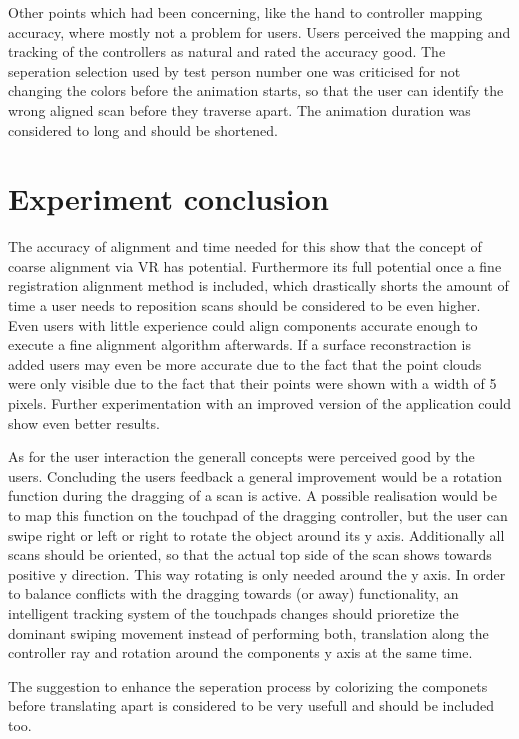 \documentclass[hyperref,english,bachelorofscience,bibnum]{cgvpub}
\begin{document}
Other points which had been concerning, like the hand to controller mapping accuracy, where mostly not a problem for users. Users perceived the mapping and tracking of the controllers as natural and rated the accuracy good. The seperation selection used by test person number one was criticised for not changing the colors before the animation starts, so that the user can identify the wrong aligned scan before they traverse apart. The animation duration was considered to long and should be shortened.

\section{Experiment conclusion}

The accuracy of alignment and time needed for this show that the concept of coarse alignment via VR has potential. Furthermore its full potential once a fine registration alignment method is included, which drastically shorts the amount of time a user needs to reposition scans   should be considered to be even higher. Even users with little experience could align components accurate enough to execute a fine alignment algorithm afterwards. If a surface reconstraction is added users may even be more accurate due to the fact that the point clouds were only visible due to the fact that their points were shown with a width of 5 pixels. Further experimentation with an improved version of the application could show even better results.

As for the user interaction the generall concepts were perceived good by the users. Concluding the users feedback a general improvement would be a rotation function during the dragging of a scan is active. A possible realisation would be to map this function on the touchpad of the dragging controller, but the user can swipe right or left or right to rotate the object around its y axis. Additionally all scans should be oriented, so that the actual top side of the scan shows towards positive y direction. This way rotating is only needed around the y axis. In order to balance conflicts with the dragging towards (or away) functionality, an intelligent tracking system of the touchpads changes should prioretize the dominant swiping movement instead of performing both, translation along the controller ray and rotation around the components y axis at the same time.

The suggestion to enhance the seperation process by colorizing the componets before translating apart is considered to be very usefull and should be included too.
\end{document}
